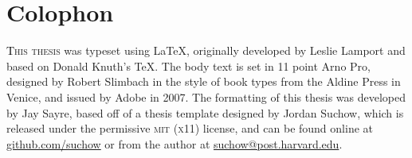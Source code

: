 \chapter*{Colophon}

\begin{center}
\parbox{200pt}{\raggedright\lettrine[lines=3,slope=-2pt,nindent=-4pt]
{\textcolor{black}{T}}{his thesis} was typeset using \LaTeX, originally developed by
Leslie Lamport and based on Donald Knuth's \TeX. The body text is set in 11 point Arno Pro,
designed by Robert Slimbach in the style of book types from the Aldine Press in Venice, and issued 
by Adobe in 2007. The formatting of this thesis was developed by Jay Sayre, based off of a thesis
template designed by Jordan Suchow, which is released under the permissive \textsc{mit} (\textsc{x}11) 
license, and can be found online at \href{https://github.com/suchow/}{github.com/suchow} or from the 
author at \href{mailto:suchow@fas.harvard.edu}{suchow@post.harvard.edu}.}
\end{center}
